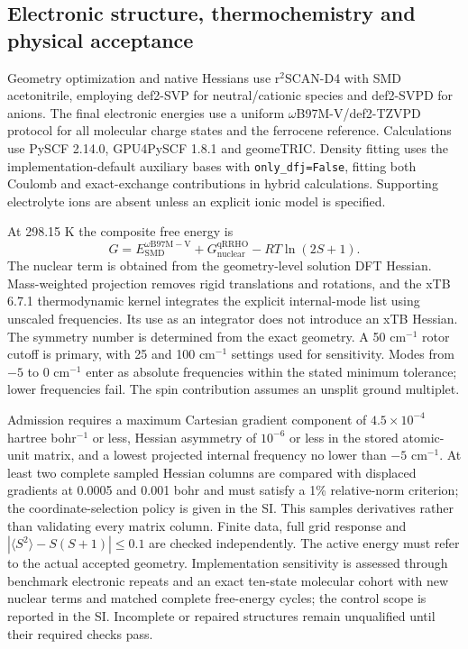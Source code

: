 \documentclass[11pt]{article}
\begin{document}
\subsection{Electronic structure, thermochemistry and physical acceptance}
Geometry optimization and native Hessians use r$^2$SCAN-D4 with SMD acetonitrile, employing def2-SVP for neutral/cationic species and def2-SVPD for anions.\cite{r2scan2020,d42019,smd2009} The final electronic energies use a uniform $\omega$B97M-V/def2-TZVPD protocol for all molecular charge states and the ferrocene reference.\cite{wb97mv2016,def22005,diffuse2010} Calculations use PySCF 2.14.0, GPU4PySCF 1.8.1 and geomeTRIC.\cite{pyscf2020,gpu4pyscf2024,geometric2016} Density fitting uses the implementation-default auxiliary bases with \texttt{only\_dfj=False}, fitting both Coulomb and exact-exchange contributions in hybrid calculations. Supporting electrolyte ions are absent unless an explicit ionic model is specified.

At 298.15 K the composite free energy is
\begin{equation}
G=E_{\mathrm{SMD}}^{\omega\mathrm{B97M-V}}+G_{\mathrm{nuclear}}^{\mathrm{qRRHO}}-RT\ln(2S+1).
\label{eq:g}
\end{equation}
The nuclear term is obtained from the geometry-level solution DFT Hessian. Mass-weighted projection removes rigid translations and rotations, and the xTB 6.7.1 thermodynamic kernel integrates the explicit internal-mode list using unscaled frequencies.\cite{grimme2012,xtbprogram2021} Its use as an integrator does not introduce an xTB Hessian. The symmetry number is determined from the exact geometry. A 50 cm$^{-1}$ rotor cutoff is primary, with 25 and 100 cm$^{-1}$ settings used for sensitivity. Modes from $-5$ to 0 cm$^{-1}$ enter as absolute frequencies within the stated minimum tolerance; lower frequencies fail. The spin contribution assumes an unsplit ground multiplet.

Admission requires a maximum Cartesian gradient component of $4.5\times10^{-4}$ hartree bohr$^{-1}$ or less, Hessian asymmetry of $10^{-6}$ or less in the stored atomic-unit matrix, and a lowest projected internal frequency no lower than $-5$ cm$^{-1}$. At least two complete sampled Hessian columns are compared with displaced gradients at 0.0005 and 0.001 bohr and must satisfy a 1\% relative-norm criterion; the coordinate-selection policy is given in the SI. This samples derivatives rather than validating every matrix column. Finite data, full grid response and $|\langle S^2\rangle-S(S+1)|\leq0.1$ are checked independently. The active energy must refer to the actual accepted geometry. Implementation sensitivity is assessed through benchmark electronic repeats and an exact ten-state molecular cohort with new nuclear terms and matched complete free-energy cycles; the control scope is reported in the SI. Incomplete or repaired structures remain unqualified until their required checks pass.
\end{document}
